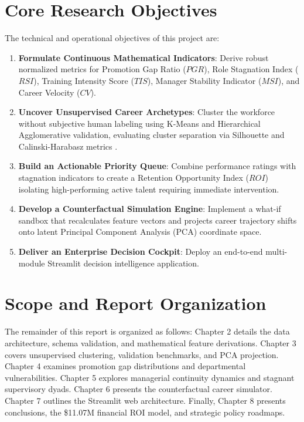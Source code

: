 \documentclass[12pt,a4paper,oneside]{report}
\begin{document}
\section{Core Research Objectives}
The technical and operational objectives of this project are:
\begin{enumerate}
  \item \textbf{Formulate Continuous Mathematical Indicators}: Derive robust normalized metrics for Promotion Gap Ratio ($PGR$), Role Stagnation Index ($RSI$), Training Intensity Score ($TIS$), Manager Stability Indicator ($MSI$), and Career Velocity ($CV$).
  \item \textbf{Uncover Unsupervised Career Archetypes}: Cluster the workforce without subjective human labeling using K-Means and Hierarchical Agglomerative validation, evaluating cluster separation via Silhouette and Calinski-Harabasz metrics \cite{ref_macqueen_kmeans, ref_ward_hierarchical}.
  \item \textbf{Build an Actionable Priority Queue}: Combine performance ratings with stagnation indicators to create a Retention Opportunity Index ($ROI$) isolating high-performing active talent requiring immediate intervention.
  \item \textbf{Develop a Counterfactual Simulation Engine}: Implement a what-if sandbox that recalculates feature vectors and projects career trajectory shifts onto latent Principal Component Analysis (PCA) coordinate space.
  \item \textbf{Deliver an Enterprise Decision Cockpit}: Deploy an end-to-end multi-module Streamlit decision intelligence application.
\end{enumerate}

\section{Scope and Report Organization}
The remainder of this report is organized as follows: Chapter 2 details the data architecture, schema validation, and mathematical feature derivations. Chapter 3 covers unsupervised clustering, validation benchmarks, and PCA projection. Chapter 4 examines promotion gap distributions and departmental vulnerabilities. Chapter 5 explores managerial continuity dynamics and stagnant supervisory dyads. Chapter 6 presents the counterfactual career simulator. Chapter 7 outlines the Streamlit web architecture. Finally, Chapter 8 presents conclusions, the \$11.07M financial ROI model, and strategic policy roadmaps.
\end{document}
